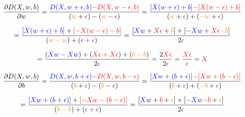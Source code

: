 \documentclass{article}
\begin{document}
\begin{displaymath}
\frac{\partial{}D(X, w, b)}{\partial{}w}=
\frac{\textcolor{blue}{D(X, w+\epsilon, b)}
\textcolor{red}{-D(X, w-\epsilon, b)}}
{(\textcolor{orange}{w}+\textcolor{violet}{\epsilon})-(
\textcolor{orange}{w}-\textcolor{violet}{\epsilon})}
=\frac{\textcolor{blue}{[X(w + \epsilon) + b]}
\textcolor{red}{-[X(w - \epsilon) + b]}}
{(\textcolor{orange}{w}+\textcolor{violet}{\epsilon})+(
\textcolor{orange}{-w}+\textcolor{violet}{\epsilon})}
\end{displaymath}

\begin{displaymath}
=\frac{\textcolor{blue}{[X(w + \epsilon) + b]}+
\textcolor{red}{[-X(w - \epsilon) - b]}}
{(\textcolor{orange}{w-w})+(\textcolor{violet}{\epsilon+\epsilon})}
=\frac{[\textcolor{blue}{Xw}+\textcolor{red}{X\epsilon}+\textcolor{orange}{b}]+
[\textcolor{blue}{-Xw}+\textcolor{red}{X\epsilon}\textcolor{orange}{-b}]}
{2\textcolor{violet}{\epsilon}}
\end{displaymath}

\begin{displaymath}
=\frac{(\textcolor{blue}{Xw-Xw})+(\textcolor{red}{X\epsilon{}+X\epsilon})+(
\textcolor{orange}{b-b})}{2\textcolor{violet}{\epsilon}}
=\frac{2\textcolor{red}{X\epsilon}}
{2\textcolor{violet}{\epsilon}}
=\frac{\textcolor{red}{X\epsilon}}
{\textcolor{violet}{\epsilon}}
=\textcolor{red}{X}
\end{displaymath}

\bigskip\bigskip\bigskip\bigskip\bigskip\bigskip\bigskip\bigskip

\begin{displaymath}
\frac{\partial{}D(X, w, b)}{\partial{}b}=
\frac{\textcolor{blue}{D(X, w, b+\epsilon)}
\textcolor{red}{-D(X, w, b-\epsilon)}}
{(\textcolor{orange}{b}+\textcolor{violet}{\epsilon})-(
\textcolor{orange}{b}-\textcolor{violet}{\epsilon})}
=\frac{\textcolor{blue}{[Xw + (b+\epsilon)]}
\textcolor{red}{-[Xw + (b-\epsilon)]}}
{(\textcolor{orange}{b}+\textcolor{violet}{\epsilon})+(
\textcolor{orange}{-b}+\textcolor{violet}{\epsilon})}
\end{displaymath}

\begin{displaymath}
=\frac{\textcolor{blue}{[Xw + (b+\epsilon)]}+
\textcolor{red}{[-Xw - (b-\epsilon)]}}
{(\textcolor{orange}{b-b})+(\textcolor{violet}{\epsilon+\epsilon})}
=\frac{[\textcolor{blue}{Xw}+\textcolor{red}{b}+\textcolor{orange}{\epsilon}]+
[\textcolor{blue}{-Xw}\textcolor{red}{-b}+\textcolor{orange}{\epsilon}]}
{2\textcolor{violet}{\epsilon}}
\end{displaymath}
\end{document}
